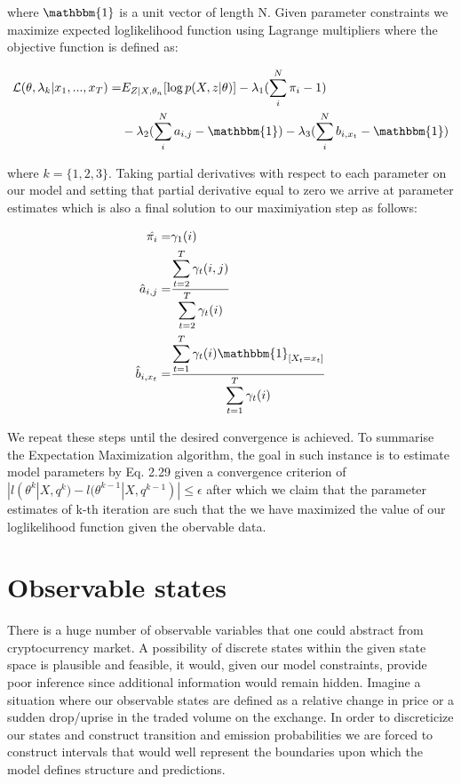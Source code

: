 where $\mathbbm{1}$ is  a unit vector of length N. Given parameter constraints we maximize expected loglikelihood function using Lagrange multipliers where the objective function is defined as:

\begin{align}
\mathcal{L}(\theta,\lambda_k|x_1,...,x_T) =& E_{Z|X,\theta_n} [\log p(X,z|\theta)] - \lambda_1(\displaystyle \sum_i^N \pi_i - 1) \\
& - \lambda_2(\displaystyle \sum_i^N a_{i,j} -  \mathbbm{1})  - \lambda_3 (\displaystyle\sum_i^N b_{i,x_t} - \mathbbm{1})
\end{align}

 where $k=\{1,2,3\}$.  Taking partial derivatives with respect to each parameter on our model and setting that partial derivative equal to zero we arrive at parameter estimates which is also a final solution to our maximiyation step as follows:


\begin{align}
\hat{\pi_i} = &  \gamma_1 (i) \\
\hat{a}_{i,j} = &  \frac{\displaystyle \sum_{t=2}^{T} \gamma_t (i,j)}{\displaystyle \sum_{t=2}^{T} \gamma_t (i)} \\
\hat{b}_{i,x_t} =&\frac{\displaystyle \sum_{t=1}^{T} \gamma_t (i) \mathbbm{1}_{[X_t = x_t ]}}{\displaystyle \sum_{t=1}^{T} \gamma_t (i)} 
\end{align}


We repeat these steps until the desired convergence is achieved. To summarise the Expectation Maximization algorithm, the goal in such instance is to estimate model parameters by Eq. 2.29 
given a convergence criterion of $|l(\theta^{k}|X,q^{k}) - l(\theta^{k-1}|X,q^{k-1})| \leq \epsilon $ after which we claim that the parameter estimates of k-th iteration are such that the we have maximized the value of our loglikelihood function given the obervable data.



\section{Observable states}

	There is a huge number of observable variables that one could abstract from cryptocurrency market. A possibility of discrete states within the given state space is plausible and feasible, it would, given our model constraints, provide poor inference since additional information would remain hidden. Imagine a situation where our observable states are defined as a relative change in price or a sudden drop/uprise in the traded volume on the exchange. In order to discreticize our states and construct transition and emission probabilities we are forced to construct intervals that would well represent the boundaries upon which the model defines structure and predictions. 
	
